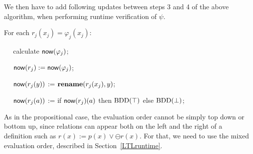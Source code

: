 We then have to add
following updates between steps 3 and 4 of the above algorithm, when performing runtime verification of
$\psi$. 

\noindent \begin{description}
\item For each $r_j ( x_j ) = \varphi_j ( x_j )$:
\item{\ \ }  calculate $\mathsf{now} ( \varphi_j )$;
\item{\ \ }  $\mathsf{now} ( r_j )  := \mathsf{now} (\varphi_j)$;
\item{\ \ } $\mathsf{now} ( r_j ( y ) )$ := $\mathbf{rename} ( r_j(x_j) ,  y )$;
\item{\ \ } $\mathsf{now} ( r_j ( a ) )$ := if $\mathsf{now} ( r_j ) ( a )$
then $\mathrm{BDD}(\top)$ else $\mathrm{BDD}(\bot)$; 
\end{description}


\noindent
As in the propositional case, the evaluation order cannot be
simply top down or bottom up, since relations can appear
both on the left and the right of a definition
such as $r ( x ) := p ( x ) \vee \ominus r ( x )$. For that,
we need to use the mixed evaluation order, described in Section~\ref{LTLruntime}.














